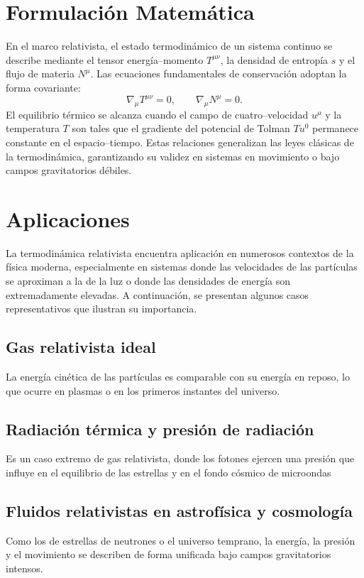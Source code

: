 \section{Formulación Matemática}

En el marco relativista, el estado termodinámico de un sistema continuo se describe mediante el tensor energía–momento \( T^{\mu\nu} \), la densidad de entropía \( s \) y el flujo de materia \( N^{\mu} \).  
Las ecuaciones fundamentales de conservación adoptan la forma covariante:
\[
\nabla_{\mu} T^{\mu\nu} = 0, \qquad \nabla_{\mu} N^{\mu} = 0.
\]
El equilibrio térmico se alcanza cuando el campo de cuatro–velocidad \( u^{\mu} \) y la temperatura \( T \) son tales que el gradiente del potencial de Tolman \( T u^{0} \) permanece constante en el espacio–tiempo.  
Estas relaciones generalizan las leyes clásicas de la termodinámica, garantizando su validez en sistemas en movimiento o bajo campos gravitatorios débiles.

\section{Aplicaciones}

La termodinámica relativista encuentra aplicación en numerosos contextos de la física moderna, 
especialmente en sistemas donde las velocidades de las partículas se aproximan a la de la luz 
o donde las densidades de energía son extremadamente elevadas. 
A continuación, se presentan algunos casos representativos que ilustran su importancia.

\subsection{Gas relativista ideal}
La energía cinética de las partículas es comparable con su energía en reposo, lo que ocurre en plasmas o en los primeros instantes del universo.

\subsection{Radiación térmica y presión de radiación}
Es un caso extremo de gas relativista, donde los fotones ejercen una presión que influye en el equilibrio de las estrellas y en el fondo cósmico de microondas

\subsection{Fluidos relativistas en astrofísica y cosmología}
Como los de estrellas de neutrones o el universo temprano, la energía, la presión y el movimiento se describen de forma unificada bajo campos gravitatorios intensos.
